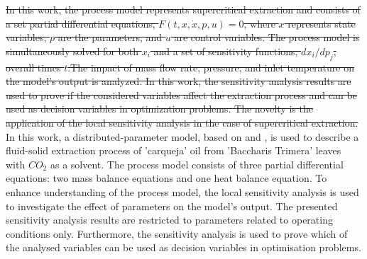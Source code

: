 \documentclass[../Parameter_fitting.tex]{subfiles}
\begin{document}
	\sout{In this work, the process model represents supercritical extraction and consists of a set partial differential equations, $F(t,x,\dot{x},p,u)=0$, where $x$ represents state variables, $p$ are the parameters, and $u$ are control variables. The process model is simultaneously solved for both $x_i$ and a set of sensitivity functions, $dx_i/dp_j$, overall times $t$.The impact of mass flow rate, pressure, and inlet temperature on the model's output is analyzed. In this work, the sensitivity analysis results are used to prove if the considered variables affect the extraction process and can be used as decision variables in optimization problems. The novelty is the application of the local sensitivity analysis in the case of supercritical extraction.}
	{\color{blue}In this work, a distributed-parameter model, based on \citet{Reverchon1996} and \citet{Vargas2006}, is used to describe a fluid-solid extraction process of 'carqueja' oil from 'Baccharis Trimera' leaves with $CO_2$ as a solvent. The process model consists of three partial differential equations: two mass balance equations and one heat balance equation. To enhance understanding of the process model, the local sensitivity analysis is used to investigate the effect of parameters on the model's output. The presented sensitivity analysis results are restricted to parameters related to operating conditions only. Furthermore, the sensitivity analysis is used to prove which of the analysed variables can be used as decision variables in optimisation problems.}
	
\end{document}
